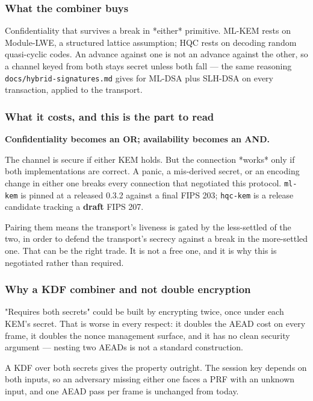 \documentclass[11pt,a4paper]{article}
\begin{document}
\subsubsection{What the combiner buys}

Confidentiality that survives a break in *either* primitive. ML-KEM rests on
Module-LWE, a structured lattice assumption; HQC rests on decoding random
quasi-cyclic codes. An advance against one is not an advance against the
other, so a channel keyed from both stays secret unless both fall — the same
reasoning \texttt{docs/hybrid-signatures.md} gives for ML-DSA plus SLH-DSA on every
transaction, applied to the transport.

\subsubsection{What it costs, and this is the part to read}

\textbf{Confidentiality becomes an OR; availability becomes an AND.}

The channel is secure if either KEM holds. But the connection *works* only
if both implementations are correct. A panic, a mis-derived secret, or an
encoding change in either one breaks every connection that negotiated this
protocol. \texttt{ml-kem} is pinned at a released 0.3.2 against a final FIPS 203;
\texttt{hqc-kem} is a release candidate tracking a \textbf{draft} FIPS 207.

Pairing them means the transport's liveness is gated by the less-settled of
the two, in order to defend the transport's secrecy against a break in the
more-settled one. That can be the right trade. It is not a free one, and it
is why this is negotiated rather than required.

\subsubsection{Why a KDF combiner and not double encryption}

"Requires both secrets" could be built by encrypting twice, once under each
KEM's secret. That is worse in every respect: it doubles the AEAD cost on
every frame, it doubles the nonce management surface, and it has no clean
security argument — nesting two AEADs is not a standard construction.

A KDF over both secrets gives the property outright. The session key depends
on both inputs, so an adversary missing either one faces a PRF with an
unknown input, and one AEAD pass per frame is unchanged from today.
\end{document}
